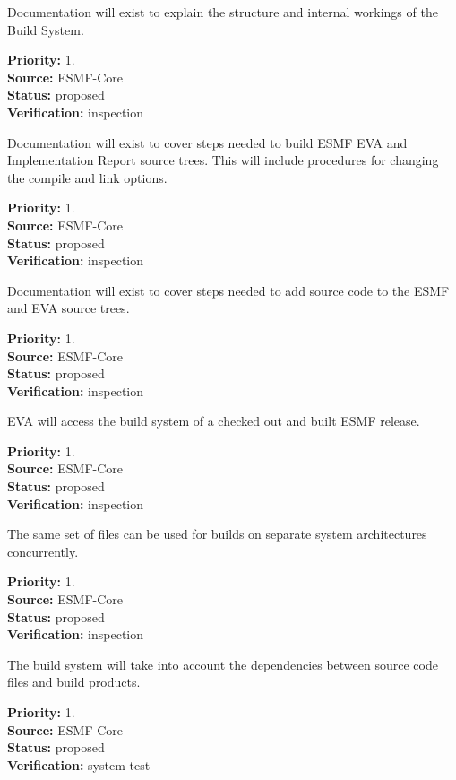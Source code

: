 Documentation will exist to explain the structure and 
internal workings of the Build System.
\begin{reqlist}
{\bf Priority:} 1. \\
{\bf Source:} ESMF-Core \\
{\bf Status:} proposed \\
{\bf Verification:} inspection
\end{reqlist}

Documentation will exist to cover steps needed to build ESMF
EVA and Implementation Report  source trees.  This will include procedures for 
changing the compile and link options.
\begin{reqlist}
{\bf Priority:} 1. \\
{\bf Source:} ESMF-Core \\
{\bf Status:} proposed \\
{\bf Verification:} inspection
\end{reqlist}

Documentation will exist to cover steps needed to add source
code to the ESMF and EVA source trees.
\begin{reqlist}
{\bf Priority:} 1. \\
{\bf Source:} ESMF-Core \\
{\bf Status:} proposed \\
{\bf Verification:} inspection
\end{reqlist}

EVA will access the build system
of a checked out and built  ESMF release.
\begin{reqlist}
{\bf Priority:} 1. \\
{\bf Source:} ESMF-Core \\
{\bf Status:} proposed \\
{\bf Verification:} inspection
\end{reqlist}


The same set of files can be used for builds on separate 
system architectures concurrently.
\begin{reqlist}
{\bf Priority:} 1. \\
{\bf Source:} ESMF-Core \\
{\bf Status:} proposed \\
{\bf Verification:} inspection
\end{reqlist}

The build system will take into account the dependencies 
between source code files and build products.  
\begin{reqlist}
{\bf Priority:} 1. \\
{\bf Source:} ESMF-Core \\
{\bf Status:} proposed \\
{\bf Verification:} system test
\end{reqlist}

